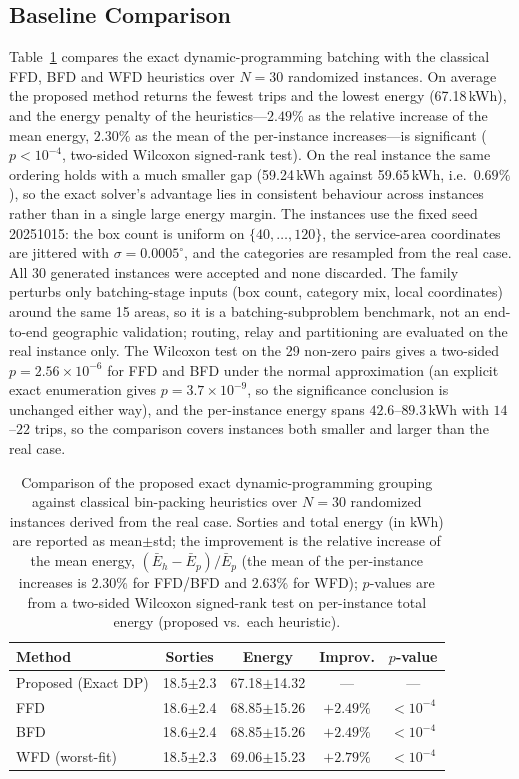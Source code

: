 \documentclass[journal]{IEEEtran}
\begin{document}
\subsection{Baseline Comparison}
Table~\ref{tab:q1_baseline} compares the exact dynamic-programming batching with
the classical FFD, BFD and WFD heuristics over $N{=}30$ randomized instances. On
average the proposed method returns the fewest trips and the lowest energy
(67.18\,kWh), and the energy penalty of the heuristics---$2.49\%$ as the
relative increase of the mean energy, $2.30\%$ as the mean of the
per-instance increases---is significant ($p<10^{-4}$, two-sided Wilcoxon
signed-rank test). On the real
instance the same ordering holds with a much smaller gap (59.24\,kWh against
59.65\,kWh, i.e.\ $0.69\%$), so the exact solver's advantage lies in consistent
behaviour across instances rather than in a single large energy margin. The
instances use the fixed seed 20251015: the box count is uniform on
$\{40,\dots,120\}$, the service-area coordinates are jittered with
$\sigma=0.0005^\circ$, and the categories are resampled from the real case. All
$30$ generated instances were accepted and none discarded. The family perturbs
only batching-stage inputs (box count, category mix, local coordinates) around
the same 15 areas, so it is a batching-subproblem benchmark, not an end-to-end
geographic validation; routing, relay and partitioning are evaluated on the
real instance only. The Wilcoxon test on the 29 non-zero pairs gives a two-sided
$p=2.56\times10^{-6}$ for FFD and BFD under the normal approximation (an
explicit exact enumeration gives $p=3.7\times10^{-9}$, so the significance
conclusion is unchanged either way), and the per-instance energy spans
$42.6$--$89.3$\,kWh with $14$--$22$ trips, so the comparison covers instances
both smaller and larger than the real case.

\begin{table}[t]
\centering
\footnotesize
\setlength{\tabcolsep}{3pt}
\caption{Comparison of the proposed exact dynamic-programming grouping against classical bin-packing heuristics over $N=30$ randomized instances derived from the real case. Sorties and total energy (in kWh) are reported as mean$\pm$std; the improvement is the relative increase of the mean energy, $(\bar E_h-\bar E_p)/\bar E_p$ (the mean of the per-instance increases is $2.30\%$ for FFD/BFD and $2.63\%$ for WFD); $p$-values are from a two-sided Wilcoxon signed-rank test on per-instance total energy (proposed vs.\ each heuristic).}
\label{tab:q1_baseline}
\begin{tabular}{lcccc}
\toprule
Method & Sorties & Energy & Improv. & $p$-value \\
\midrule
Proposed (Exact DP) & 18.5$\pm$2.3 & 67.18$\pm$14.32 & --- & --- \\
FFD & 18.6$\pm$2.4 & 68.85$\pm$15.26 & $+2.49\%$ & $<10^{-4}$ \\
BFD & 18.6$\pm$2.4 & 68.85$\pm$15.26 & $+2.49\%$ & $<10^{-4}$ \\
WFD (worst-fit) & 18.5$\pm$2.3 & 69.06$\pm$15.23 & $+2.79\%$ & $<10^{-4}$ \\
\bottomrule
\end{tabular}
\end{table}
\end{document}
